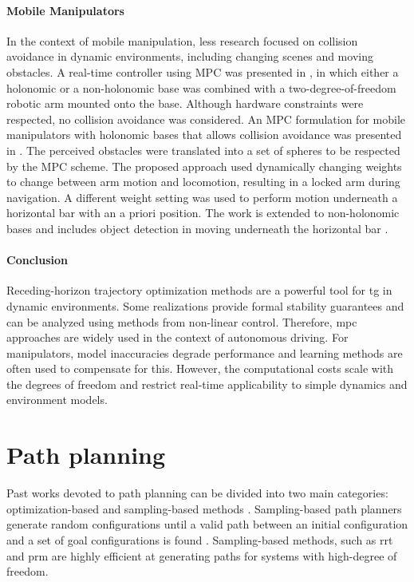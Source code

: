 \paragraph{Mobile Manipulators}

In the context of mobile manipulation, less research focused on collision
avoidance in dynamic environments, including changing scenes and moving
obstacles. A real-time controller using MPC was presented in \cite{Ide2011}, in
which either a holonomic or a non-holonomic base was combined with a
two-degree-of-freedom robotic arm mounted onto the base. Although hardware
constraints were respected, no collision avoidance was considered.  An MPC
formulation for mobile manipulators with holonomic bases that allows collision
avoidance was presented in \cite{Avanzini2015}. The perceived obstacles were
translated into a set of spheres to be respected by the MPC scheme. The proposed
approach used dynamically changing weights to change between arm motion and
locomotion, resulting in a locked arm during navigation. A different weight
setting was used to perform motion underneath a horizontal bar with an a priori
position. The work is extended to non-holonomic bases and includes object
detection in moving underneath the horizontal bar \cite{Avanzini2018}. 


\paragraph{Conclusion}

Receding-horizon trajectory optimization methods are a
powerful tool for \ac{tg} in dynamic environments.
Some realizations provide formal stability guarantees and can be analyzed
using methods from non-linear control. Therefore, \ac{mpc}
approaches are widely used in the context of autonomous
driving. For manipulators, model inaccuracies degrade
performance and learning methods are often used to
compensate for this. However, the computational costs scale
with the degrees of freedom and restrict real-time
applicability to simple dynamics and environment models.

\section{Path planning}
\label{sec:path_planning}

Past works devoted to path planning can be divided into two
main categories: optimization-based and sampling-based
methods \cite{LaValle2006,Mukadam2017}. Sampling-based path
planners generate random configurations until a valid path
between an initial configuration and a set of goal
configurations is found \cite{Karaman2011}. Sampling-based
methods, such as \acf{rrt}
\cite{Webb2013,Kleinbort2019,Kuffner2000} and \acf{prm}
\cite{Hsu2002,Faust2017} are highly
efficient at generating paths for systems with high-degree
of freedom.

